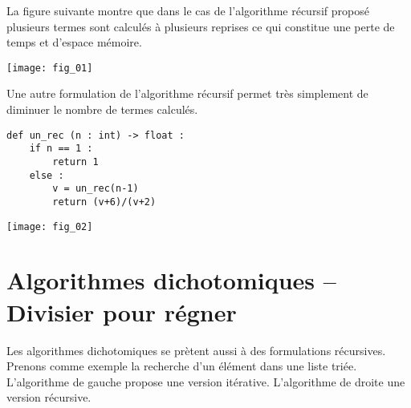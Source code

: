 La figure suivante montre que dans le cas de l'algorithme récursif proposé plusieurs termes sont calculés à plusieurs reprises ce qui constitue une perte de temps et d'espace mémoire. 

\begin{center}
\texttt{[image: fig\_01]}
\end{center}

Une autre formulation de l'algorithme récursif permet très simplement de diminuer le nombre de termes calculés. 



\noindent\begin{minipage}[c]{.45\linewidth}
\begin{lstlisting}
def un_rec (n : int) -> float :
    if n == 1 :
        return 1
    else : 
        v = un_rec(n-1)
        return (v+6)/(v+2)
\end{lstlisting}
\end{minipage} \hfill
\begin{minipage}[c]{.45\linewidth}
\begin{center}
\texttt{[image: fig\_02]}
\end{center}\end{minipage}

\section{Algorithmes dichotomiques -- Divisier pour régner}

Les algorithmes dichotomiques se prètent aussi à des formulations récursives. Prenons comme exemple la recherche d'un élément dans une liste triée. L'algorithme de gauche propose une version itérative. L'algorithme de droite une version récursive. 

